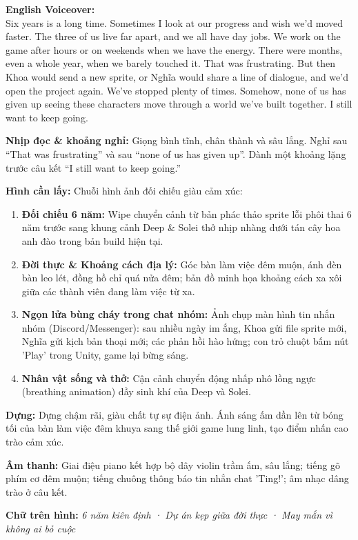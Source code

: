 \documentclass[11pt,a4paper]{article}
\newcommand{\field}[2]{\textbf{\color{divergencynavy}#1:} #2\par\vspace{2pt}}
\newcommand{\voBox}[2]{%
  \vspace{3pt}%
  \noindent\colorbox{codebg}{%
    \parbox{\dimexpr\linewidth-2\fboxsep}{%
      \textbf{\color{divergencynavy}#1:}\\
      #2%
    }%
  }\par\vspace{3pt}%
}
\begin{document}
\voBox{English Voiceover}{Six years is a long time. Sometimes I look at our progress and wish we'd moved faster. The three of us live far apart, and we all have day jobs. We work on the game after hours or on weekends when we have the energy. There were months, even a whole year, when we barely touched it. That was frustrating. But then Khoa would send a new sprite, or Nghĩa would share a line of dialogue, and we'd open the project again. We've stopped plenty of times. Somehow, none of us has given up seeing these characters move through a world we've built together. I still want to keep going.}

\field{Nhịp đọc \& khoảng nghỉ}{Giọng bình tĩnh, chân thành và sâu lắng. Nghỉ sau “That was frustrating” và sau “none of us has given up”. Dành một khoảng lặng trước câu kết “I still want to keep going.”}

\field{Hình cần lấy}{Chuỗi hình ảnh đối chiếu giàu cảm xúc:
\begin{enumerate}
    \item \textbf{Đối chiếu 6 năm:} Wipe chuyển cảnh từ bản phác thảo sprite lỗi phôi thai 6 năm trước sang khung cảnh Deep \& Solei thở nhịp nhàng dưới tán cây hoa anh đào trong bản build hiện tại.
    \item \textbf{Đời thực \& Khoảng cách địa lý:} Góc bàn làm việc đêm muộn, ánh đèn bàn leo lét, đồng hồ chỉ quá nửa đêm; bản đồ minh họa khoảng cách xa xôi giữa các thành viên đang làm việc từ xa.
    \item \textbf{Ngọn lửa bùng cháy trong chat nhóm:} Ảnh chụp màn hình tin nhắn nhóm (Discord/Messenger): sau nhiều ngày im ắng, Khoa gửi file sprite mới, Nghĩa gửi kịch bản thoại mới; các phản hồi hào hứng; con trỏ chuột bấm nút 'Play' trong Unity, game lại bừng sáng.
    \item \textbf{Nhân vật sống và thở:} Cận cảnh chuyển động nhấp nhô lồng ngực (breathing animation) đầy sinh khí của Deep và Solei.
\end{enumerate}}

\field{Dựng}{Dựng chậm rãi, giàu chất tự sự điện ảnh. Ánh sáng ấm dần lên từ bóng tối của bàn làm việc đêm khuya sang thế giới game lung linh, tạo điểm nhấn cao trào cảm xúc.}

\field{Âm thanh}{Giai điệu piano kết hợp bộ dây violin trầm ấm, sâu lắng; tiếng gõ phím cơ đêm muộn; tiếng chuông thông báo tin nhắn chat 'Ting!'; âm nhạc dâng trào ở câu kết.}

\field{Chữ trên hình}{\textit{6 năm kiên định · Dự án kẹp giữa đời thực · May mắn vì không ai bỏ cuộc}}
\end{document}
